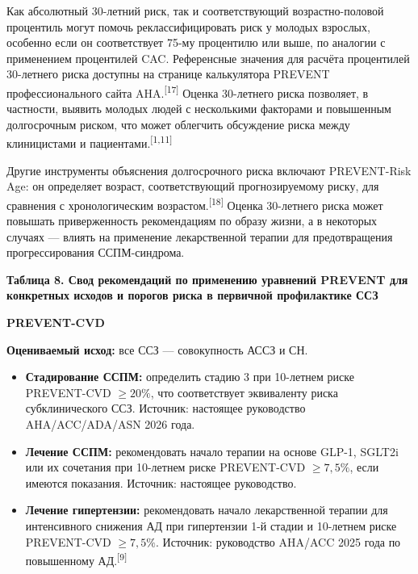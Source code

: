 \documentclass[11pt,a4paper]{article}
\newcommand{\src}[1]{\textsuperscript{[#1]}}
\newcommand{\heading}[1]{\par\medskip\textbf{#1}\par}
\begin{document}
Как абсолютный 30-летний риск, так и соответствующий возрастно-половой процентиль могут помочь реклассифицировать риск у молодых взрослых, особенно если он соответствует 75-му процентилю или выше, по аналогии с применением процентилей CAC. Референсные значения для расчёта процентилей 30-летнего риска доступны на странице калькулятора PREVENT профессионального сайта AHA.\src{17} Оценка 30-летнего риска позволяет, в частности, выявить молодых людей с несколькими факторами и повышенным долгосрочным риском, что может облегчить обсуждение риска между клиницистами и пациентами.\src{1,11}

Другие инструменты объяснения долгосрочного риска включают PREVENT-Risk Age: он определяет возраст, соответствующий прогнозируемому риску, для сравнения с хронологическим возрастом.\src{18} Оценка 30-летнего риска может повышать приверженность рекомендациям по образу жизни, а в некоторых случаях --- влиять на применение лекарственной терапии для предотвращения прогрессирования ССПМ-синдрома.

\heading{Таблица 8. Свод рекомендаций по применению уравнений PREVENT для конкретных исходов и порогов риска в первичной профилактике ССЗ}
\heading{PREVENT-CVD}
\textbf{Оцениваемый исход:} все ССЗ --- совокупность АССЗ и СН.
\begin{itemize}
\item \textbf{Стадирование ССПМ:} определить стадию 3 при 10-летнем риске PREVENT-CVD $\geq20\%$, что соответствует эквиваленту риска субклинического ССЗ. Источник: настоящее руководство AHA/ACC/ADA/ASN 2026 года.
\item \textbf{Лечение ССПМ:} рекомендовать начало терапии на основе GLP-1, SGLT2i или их сочетания при 10-летнем риске PREVENT-CVD $\geq7{,}5\%$, если имеются показания. Источник: настоящее руководство.
\item \textbf{Лечение гипертензии:} рекомендовать начало лекарственной терапии для интенсивного снижения АД при гипертензии 1-й стадии и 10-летнем риске PREVENT-CVD $\geq7{,}5\%$. Источник: руководство AHA/ACC 2025 года по повышенному АД.\src{9}
\end{itemize}
\end{document}
